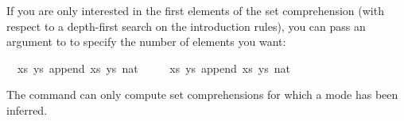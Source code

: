 \begin{isabellebody}
\begin{isamarkuptext}
\end{isamarkuptext}%
\isamarkuptrue%
%
\begin{isamarkuptext}%
\noindent If you are only interested in the first elements of the
  set comprehension (with respect to a depth-first search on the
  introduction rules), you can pass an argument to \hyperlink{command.values}{\mbox{}}
  to specify the number of elements you want:%
\end{isamarkuptext}%
\isamarkuptrue%
%
\isadelimquote
%
\endisadelimquote
%
\isatagquote
{}\isamarkupfalse%
\ {}\ {\isachardoublequoteopen}{\isacharbraceleft}{\isacharparenleft}xs{\isacharcomma}\ ys{\isacharparenright}{\isachardot}\ append\ xs\ ys\ {\isacharbrackleft}{\isacharparenleft}{}{\isacharcolon}{\isacharcolon}nat{\isacharparenright}{\isacharcomma}\ {}{\isacharcomma}\ {}{\isacharcomma}\ {}{\isacharbrackright}{\isacharbraceright}{\isachardoublequoteclose}\isanewline
{}\isamarkupfalse%
\ {}\ {\isachardoublequoteopen}{\isacharbraceleft}{\isacharparenleft}xs{\isacharcomma}\ ys{\isacharparenright}{\isachardot}\ append\ xs\ ys\ {\isacharbrackleft}{\isacharparenleft}{}{\isacharcolon}{\isacharcolon}nat{\isacharparenright}{\isacharcomma}\ {}{\isacharcomma}\ {}{\isacharcomma}\ {}{\isacharbrackright}{\isacharbraceright}{\isachardoublequoteclose}%
\endisatagquote
{\isafoldquote}%
%
\isadelimquote
%
\endisadelimquote
%
\begin{isamarkuptext}%
\noindent The \hyperlink{command.values}{\mbox{}} command can only compute set
  comprehensions for which a mode has been inferred.


\end{isamarkuptext}
\end{isabellebody}
